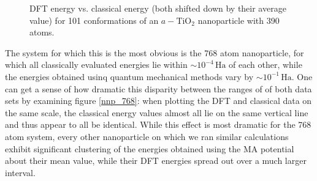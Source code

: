 \documentclass[aps,prb,twocolumn,amsmath,amssymb,superscriptaddress,longbibliography]{revtex4-1}
\newcommand\tab[1][1cm]{\hspace*{#1}} %
\begin{document}
\begin{figure}[htb]
\caption{DFT energy vs. classical energy (both shifted down by their average value) for 101 conformations of an $a-\text{TiO}_2$ nanoparticle with 390 atoms.}
\label{nnp_390}
\end{figure}

\tab The system for which this is the most obvious is the 768 atom nanoparticle, for which all classically evaluated energies lie within $\sim 10^{-4}\,\text{Ha}$ of each other, while the energies obtained usinq quantum mechanical methods vary by $\sim 10^{-1}\,\text{Ha}$.
One can get a sense of how dramatic this disparity between the ranges of of both data sets by examining figure \ref{nnp_768}: when plotting the DFT and classical data on the same scale, the classical energy values almost all lie on the same vertical line and thus appear to all be identical. 
While this effect is most dramatic for the 768 atom system, every other nanoparticle on which we ran similar calculations exhibit significant clustering of the energies obtained using the MA potential about their mean value, while their DFT energies spread out over a much larger interval.
\end{document}
